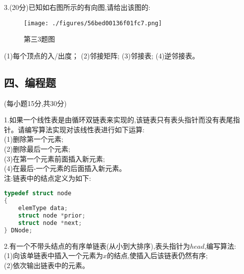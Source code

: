 3.(20分)已知如右图所示的有向图,请给出该图的:
\begin{figure}[ht]
\centering
\texttt{[image: ./figures/56bed00136f01fc7.png]}
\caption{第三3题图} \label{fig_ZSDS11_1}
\end{figure}
(1)每个顶点的入/出度；
(2)邻接矩阵;
(3)邻接表;
(4)逆邻接表。

\subsection{四、编程题}
(每小题15分,共30分)

1.如果一个线性表是由循环双链表来实现的,该链表只有表头指针而没有表尾指针。请编写算法实现对该线性表进行如下运算: \\
(1)删除第一个元素; \\
(2)删除最后一个元素; \\
(3)在第一个元素前面插入新元素; \\
(4)在最后-一个元素的后面插入新元素。\\
注:链表中的结点定义为如下:
\begin{lstlisting}[language=cpp]
typedef struct node
{
    elemType data;
    struct node *prior;
    struct node *next;
} DNode;
\end{lstlisting}

2.有一个不带头结点的有序单链表(从小到大排序),表头指针为$head$,编写算法: \\
(1)向该单链表中插入一个元素为$x$的结点,使插入后该链表仍然有序; \\
(2)依次输出链表中的元素。